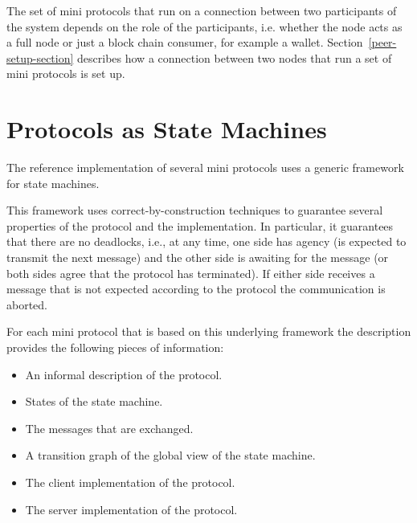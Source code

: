 \documentclass{report}
\newcommand{\hide}[1]{}
\newcommand{\hide}[1]{}
\theoremstyle{definition}{
  \newtheorem{lemma}{Lemma}[section] %
  \newtheorem{definition}[lemma]{Definition}
}
\theoremstyle{theorem}{
  \newtheorem{invariant}[lemma]{Invariant}
  \newtheorem{proofobligation}[lemma]{Proof Obligation}
}
\numberwithin{equation}{lemma}
\begin{document}
The set of mini protocols that run on a connection between two participants of the system
depends on the role of the participants, i.e. whether the node acts as a full node or just
a block chain consumer, for example a wallet.
Section~\ref{peer-setup-section} describes how a connection between two nodes
that run a set of mini protocols is set up.

\section{Protocols as State Machines}
The reference implementation of several mini protocols uses a generic framework
for state machines.
\hide{
The Haskell implementation of the state machine framework is described in
Section~\ref{Haskell-state-machine}.
}
This framework uses correct-by-construction techniques to guarantee
several properties of the protocol and the implementation.
In particular, it guarantees that there are no deadlocks, i.e., at any time, one side has agency
(is expected to transmit the next message) and the other side is awaiting for
the message (or both sides agree that the protocol has terminated).
If either side receives a message that is not expected according to the protocol
the communication is aborted.

For each mini protocol that is based on this underlying framework the description provides the
following pieces of information:

\begin{itemize}
\item An informal description of the protocol.
\item States of the state machine.
\item The messages that are exchanged.
\item A transition graph of the global view of the state machine.
\item The client implementation of the protocol.
\item The server implementation of the protocol.
\end{itemize}
\end{document}
